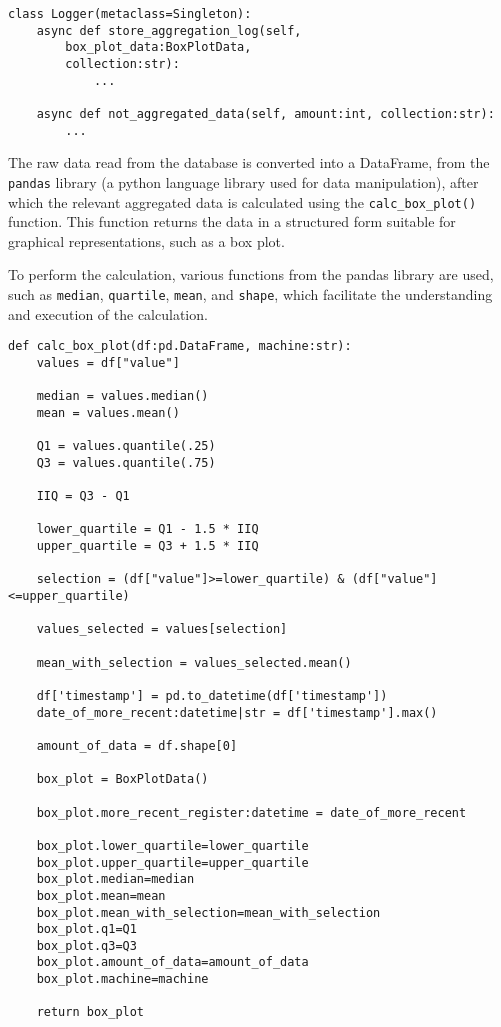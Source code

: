 \begin{Verbatim}[fontsize=\small, baselinestretch=0.8]
class Logger(metaclass=Singleton):
    async def store_aggregation_log(self,
        box_plot_data:BoxPlotData,
        collection:str):
            ...
            
    async def not_aggregated_data(self, amount:int, collection:str):
        ...
\end{Verbatim}

The raw data read from the database is converted into a DataFrame, from the \texttt{pandas} library \cite{pandasDocs} (a python language library used for data manipulation), after which the relevant aggregated data is calculated using the \texttt{calc\_box\_plot()} function. This function returns the data in a structured form suitable for graphical representations, such as a box plot.

To perform the calculation, various functions from the pandas library are used, such as \texttt{median}, \texttt{quartile}, \texttt{mean}, and \texttt{shape}, which facilitate the understanding and execution of the calculation.

\begin{Verbatim}[fontsize=\small, baselinestretch=0.8]
def calc_box_plot(df:pd.DataFrame, machine:str):
    values = df["value"]

    median = values.median()
    mean = values.mean()

    Q1 = values.quantile(.25)
    Q3 = values.quantile(.75)

    IIQ = Q3 - Q1

    lower_quartile = Q1 - 1.5 * IIQ
    upper_quartile = Q3 + 1.5 * IIQ
    
    selection = (df["value"]>=lower_quartile) & (df["value"]<=upper_quartile)

    values_selected = values[selection]

    mean_with_selection = values_selected.mean()

    df['timestamp'] = pd.to_datetime(df['timestamp'])
    date_of_more_recent:datetime|str = df['timestamp'].max()

    amount_of_data = df.shape[0]

    box_plot = BoxPlotData()

    box_plot.more_recent_register:datetime = date_of_more_recent

    box_plot.lower_quartile=lower_quartile
    box_plot.upper_quartile=upper_quartile
    box_plot.median=median
    box_plot.mean=mean
    box_plot.mean_with_selection=mean_with_selection
    box_plot.q1=Q1
    box_plot.q3=Q3
    box_plot.amount_of_data=amount_of_data
    box_plot.machine=machine

    return box_plot
\end{Verbatim}

